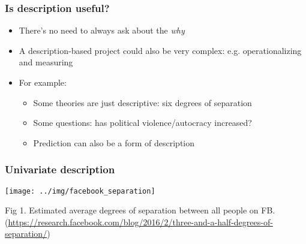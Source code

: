 \documentclass[aspectratio=43]{beamer}
\begin{document}
\begin{frame}
\frametitle{Is description useful?}
\centering

\begin{itemize}
  \item There's no need to always ask about the \textit{why}
  \item A description-based project could also be very complex: e.g. operationalizing and measuring 
  \item For example:
  \begin{itemize}
    \item Some theories are just descriptive: six degrees of separation
    \item Some questions: has political violence/autocracy increased?
    \item Prediction can also be a form of description
  \end{itemize}
\end{itemize}

\end{frame}


%
%




\begin{frame}
\frametitle{Univariate description}
\centering

\texttt{[image: ../img/facebook\_separation]}

{\footnotesize Fig 1. Estimated average degrees of separation between all people on FB.}
{\tiny (\url{https://research.facebook.com/blog/2016/2/three-and-a-half-degrees-of-separation/})}

\end{frame}
\end{document}

